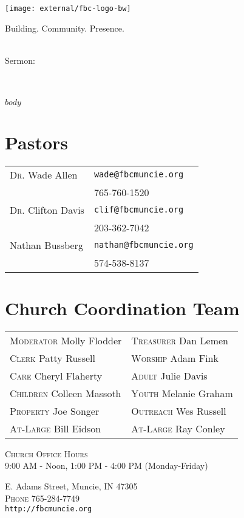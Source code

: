 \documentclass[
notumble,
nofoldmark,
letterpaper,
]{leaflet}
\begin{document}
\begin{titlepage}
\centering
\vfill
{\centering
\texttt{[image: external/fbc-logo-bw]}\par}
\vfill
\large Building. Community. Presence.
\vfill

\LARGE\sundaydate\\
\vfill
\large Sermon:\\
\LARGE\sermontitle\\
\LARGE\scripture\\

\vfill
\end{titlepage}
\thispagestyle{empty}

$body$

\vfill



\vfill



\clearpage

\vfill



\vfill



\vfill

\section{Pastors}
\begin{tabular}{@{}ll}
\textsc{Dr.} Wade Allen & \verb|wade@fbcmuncie.org|\\ 
 & 765-760-1520 \\
 \textsc{Dr.} Clifton Davis & \verb|clif@fbcmuncie.org|\\ 
 & 203-362-7042 \\
 Nathan Bussberg & \verb|nathan@fbcmuncie.org|\\ 
 & 574-538-8137 \\
\end{tabular}
\section{Church Coordination Team}
\begin{tabular}{@{}ll}
\textsc{Moderator} Molly Flodder & \textsc{Treasurer} Dan Lemen\\
\textsc{Clerk} Patty Russell & \textsc{Worship} Adam Fink\\
\textsc{Care} Cheryl Flaherty & \textsc{Adult} Julie Davis \\
\textsc{Children} Colleen Massoth & \textsc{Youth} Melanie Graham \\
\textsc{Property} Joe Songer & \textsc{Outreach} Wes Russell \\
\textsc{At-Large} Bill Eidson & \textsc{At-Large} Ray Conley \\
\end{tabular}

\medskip

\centering
\textsc{Church Office Hours} \\
9:00 AM - Noon, 1:00 PM - 4:00 PM (Monday-Friday)

\medskip

 E. Adams Street, Muncie, IN 47305\\
\textsc{Phone} 765-284-7749\\
\texttt{http://fbcmuncie.org}

\loggingall
\end{document}
